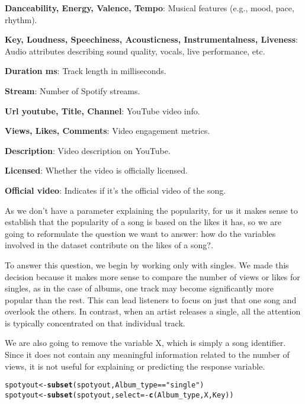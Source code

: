 \documentclass[11pt]{article}\usepackage[]{graphicx}\usepackage[]{xcolor}
\makeatletter
\newcommand{\hlsng}[1]{\textcolor[rgb]{0.192,0.494,0.8}{#1}}%
\newcommand{\hlopt}[1]{\textcolor[rgb]{0,0,0}{#1}}%
\newcommand{\hldef}[1]{\textcolor[rgb]{0.345,0.345,0.345}{#1}}%
\newcommand{\hlkwb}[1]{\textcolor[rgb]{0.69,0.353,0.396}{#1}}%
\newcommand{\hlkwc}[1]{\textcolor[rgb]{0.333,0.667,0.333}{#1}}%
\newcommand{\hlkwd}[1]{\textcolor[rgb]{0.737,0.353,0.396}{\textbf{#1}}}%
\newenvironment{kframe}{%
 \def\at@end@of@kframe{}%
 \ifinner\ifhmode%
  \def\at@end@of@kframe{\end{minipage}}%
  \begin{minipage}{\columnwidth}%
 \fi\fi%
 \def\FrameCommand##1{\hskip\@totalleftmargin \hskip-\fboxsep
 \colorbox{shadecolor}{##1}\hskip-\fboxsep
     \hskip-\linewidth \hskip-\@totalleftmargin \hskip\columnwidth}%
 \MakeFramed {\advance\hsize-\width
   \@totalleftmargin\z@ \linewidth\hsize
   \@setminipage}}%
 {\par\unskip\endMakeFramed%
 \at@end@of@kframe}
\newenvironment{knitrout}{}{} %
\makeatother
\begin{document}
\textbf{Danceability, Energy, Valence, Tempo}: Musical features (e.g., mood, pace, rhythm).

\textbf{Key, Loudness, Speechiness, Acousticness, Instrumentalness, Liveness}: Audio attributes describing sound quality, vocals, live performance, etc.

\textbf{Duration ms}: Track length in milliseconds.

\textbf{Stream}: Number of Spotify streams.

\textbf{Url youtube, Title, Channel}: YouTube video info.

\textbf{Views, Likes, Comments}: Video engagement metrics.

\textbf{Description}: Video description on YouTube.

\textbf{Licensed}: Whether the video is officially licensed.

\textbf{Official video}: Indicates if it's the official video of the song.

As we don't have a parameter explaining the popularity, for us it makes sense to establish that the popularity of a song is based on the likes it has, so we are going to reformulate the question we want to answer: how do the variables involved in the dataset contribute on the likes of a song?.  

To answer this question, we begin by working only with singles. We made this decision because it makes more sense to compare the number of views or likes for singles, as in the case of albums, one track may become significantly more popular than the rest. This can lead listeners to focus on just that one song and overlook the others. In contrast, when an artist releases a single, all the attention is typically concentrated on that individual track. 

We are also going to remove the variable X, which is simply a song identifier. Since it does not contain any meaningful information related to the number of views, it is not useful for explaining or predicting the response variable.

\begin{knitrout}
\color{fgcolor}\begin{kframe}
\begin{alltt}
\hldef{spotyout}\hlkwb{<-} \hlkwd{subset}\hldef{(spotyout, Album_type}\hlopt{==}\hlsng{"single"}\hldef{)}
\hldef{spotyout}\hlkwb{<-} \hlkwd{subset}\hldef{(spotyout,} \hlkwc{select} \hldef{=} \hlopt{-}\hlkwd{c}\hldef{(Album_type,X,Key) )}
\end{alltt}
\end{kframe}
\end{knitrout}
\end{document}
